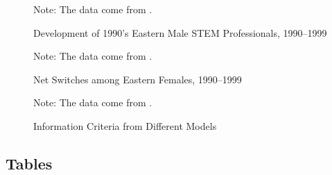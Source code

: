\documentclass[a4paper, oneside, hyperfootnotes = false]{article}
\begin{document}
{\begin{figure}[ht]
	\centering
	\caption{Development of 1990's Eastern Male STEM Professionals, 1990–1999}
	\label{fig:survivalmale}
	\fontsize{9pt}{11pt}\selectfont
	\def\svgwidth{\textwidth}
	
	\vspace{2mm}
	\parbox{10cm}{
	\linespread{1}\footnotesize Note: The data come from \cite{SOEP2023}.}
\end{figure}

\begin{figure}[ht]
	\centering
	\caption{Net Switches among Eastern Females, 1990–1999}
	\label{fig:netswitches}
	\fontsize{9pt}{11pt}\selectfont
	\def\svgwidth{\textwidth}
	
	\vspace{2mm}
	\parbox{10cm}{
		\linespread{1}\footnotesize Note: The data come from \cite{SOEP2023}.}
\end{figure}

\begin{figure}[ht]
	\centering
	\caption{Information Criteria from Different Models}
	\label{fig:information}
	\fontsize{9pt}{11pt}\selectfont
	\def\svgwidth{\textwidth}
	
	\vspace{2mm}
	\parbox{10cm}{
		\linespread{1}\footnotesize Note: The data come from \cite{SOEP2023}.}
\end{figure}

\clearpage

{}
\subsection*{Tables}
\label{tables}

}
\end{document}
